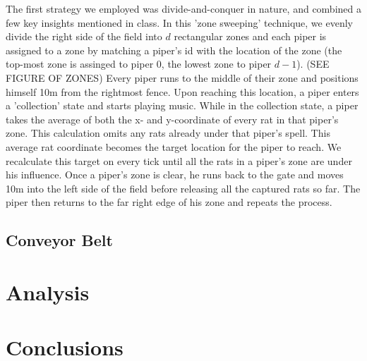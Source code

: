 \documentclass{article}
\begin{document}
The first strategy we employed was divide-and-conquer in nature, and combined a few key insights
mentioned in class. In this 'zone sweeping' technique, we evenly divide the right side of the field into
$d$ rectangular zones and each piper is assigned to a zone by matching a piper's id with the location
of the zone (the top-most zone is assinged to piper 0, the lowest zone to piper $d-1$). (SEE FIGURE OF ZONES)
Every piper runs to the middle of their zone and positions himself 10m from the rightmost fence.
Upon reaching this location, a piper enters a 'collection' state and starts playing music. While in the
collection state, a piper takes the average of both the x- and y-coordinate of every rat in that piper's
zone. This calculation omits any rats already under that piper's spell. This average rat coordinate becomes
the target location for the piper to reach. We recalculate this target on every tick until all the rats
in a piper's zone are under his influence. Once a piper's zone is clear, he runs back to the gate and moves
10m into the left side of the field before releasing all the captured rats so far. The piper then returns to
the far right edge of his zone and repeats the process.

\subsection{Conveyor Belt}

\section{Analysis}

\section{Conclusions}


\newpage




\end{document}
